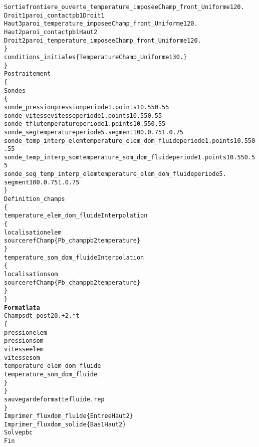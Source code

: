 \begin{alltt}
            Sortie frontiere_ouverte_temperature_imposee    Champ_front_Uniforme 1 20.
            Droit1 paroi_contact pb1  Droit1
            Haut3  paroi_temperature_imposee    Champ_front_Uniforme 1 20.
            Haut2  paroi_contact pb1  Haut2
            Droit2 paroi_temperature_imposee    Champ_front_Uniforme 1 20.
        \}
        conditions_initiales \{ Temperature Champ_Uniforme 1 30. \}
    \}
    Postraitement
    \{
        Sondes
        \{
            sonde_pression  pression periode 1.     points 1    0.55 0.55
            sonde_vitesse   vitesse periode 1.      points 1    0.55 0.55
            sonde_tflu      temperature periode 1.  points 1    0.55 0.55
            sonde_seg       temperature periode 5.  segment 10 0. 0.75 1. 0.75
            sonde_temp_interp_elem temperature_elem_dom_fluide periode 1. points 1   0.55 0.55
            sonde_temp_interp_som  temperature_som_dom_fluide  periode 1. points 1   0.55 0.55
            sonde_seg_temp_interp_elem temperature_elem_dom_fluide periode 5. 
                                                                    segment 10 0. 0.75 1. 0.75
        \}
        Definition_champs 
        \{
            temperature_elem_dom_fluide Interpolation
            \{
                localisation elem
                source refChamp \{ Pb_champ pb2 temperature \}
            \}
            temperature_som_dom_fluide Interpolation 
            \{
                localisation som
                source refChamp \{ Pb_champ pb2 temperature \}
            \}
        \}
        {\bf{Format lata}}
        Champs dt_post 20.+2.*t
        \{
            pression elem
            pression som
            vitesse elem
            vitesse som
            temperature_elem_dom_fluide
            temperature_som_dom_fluide
        \}
    \}
    sauvegarde formatte fluide.rep
\}
Imprimer_flux dom_fluide \{ Entree Haut2 \}
Imprimer_flux dom_solide \{ Bas1 Haut2 \}
Solve pbc
Fin
\end{alltt}
